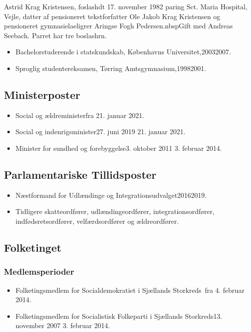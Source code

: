 \documentclass[11pt, a4paper]{awesome-cv}
\begin{document}
\makecvheader[R]
\makelettertitle
\begin{cvletter}
Astrid Krag Kristensen, foslashdt 17. november 1982 paring Sct. Maria Hospital, Vejle, datter af pensioneret tekstforfatter Ole Jakob Krag Kristensen og pensioneret gymnasielaeligrer Aringse Fogh Pedersen.nbspGift med Andreas Seebach. Parret har tre boslashrn.

\begin{itemize}
\item Bachelorstuderende i statskundskab, Københavns Universitet,20032007.
\item Sproglig studentereksamen, Tørring Amtsgymnasium,19982001.
\end{itemize}
\subsection*{Ministerposter}
\begin{itemize}
\item Social og ældreministerfra 21. januar 2021.
\item Social og indenrigsminister27. juni 2019  21. januar 2021.
\item Minister for sundhed og forebyggelse3. oktober 2011  3. februar 2014.
\end{itemize}
\subsection*{Parlamentariske Tillidsposter}
\begin{itemize}
\item Næstformand for Udlændinge og Integrationsudvalget20162019.
\item Tidligere skatteordfører, udlændingeordfører, integrationsordfører, indfødsretsordfører, velfærdsordfører og ældreordfører.
\end{itemize}
\subsection*{Folketinget}
\subsubsection*{Medlemsperioder}
\begin{itemize}
\item Folketingsmedlem for Socialdemokratiet i Sjællands Storkreds fra 4. februar 2014.
\item Folketingsmedlem for Socialistisk Folkeparti i Sjællands Storkreds13. november 2007  3. februar 2014.
\end{itemize}

\end{cvletter}
\end{document}
